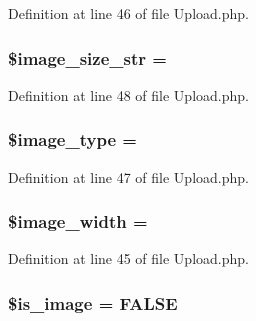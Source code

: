 Definition at line 46 of file Upload.\+php.

\subsubsection[{\texorpdfstring{\$image\+\_\+size\+\_\+str}{$image_size_str}}]{\setlength{\rightskip}{0pt plus 5cm}\$image\+\_\+size\+\_\+str = \textquotesingle{}\textquotesingle{}}\hypertarget{class_c_i___upload_a3a1769072af8ab3b0c5d6e0c1a1ae2ef}{}\label{class_c_i___upload_a3a1769072af8ab3b0c5d6e0c1a1ae2ef}


Definition at line 48 of file Upload.\+php.

\subsubsection[{\texorpdfstring{\$image\+\_\+type}{$image_type}}]{\setlength{\rightskip}{0pt plus 5cm}\$image\+\_\+type = \textquotesingle{}\textquotesingle{}}\hypertarget{class_c_i___upload_a939d6733d998cce893403d2f59f40317}{}\label{class_c_i___upload_a939d6733d998cce893403d2f59f40317}


Definition at line 47 of file Upload.\+php.

\subsubsection[{\texorpdfstring{\$image\+\_\+width}{$image_width}}]{\setlength{\rightskip}{0pt plus 5cm}\$image\+\_\+width = \textquotesingle{}\textquotesingle{}}\hypertarget{class_c_i___upload_a8dadc2d2dcc0f25529a2d1e080d08169}{}\label{class_c_i___upload_a8dadc2d2dcc0f25529a2d1e080d08169}


Definition at line 45 of file Upload.\+php.

\subsubsection[{\texorpdfstring{\$is\+\_\+image}{$is_image}}]{\setlength{\rightskip}{0pt plus 5cm}\${\bf is\+\_\+image} = F\+A\+L\+SE}\hypertarget{class_c_i___upload_a4dae8ae20ed5fdf406554e1911065753}{}\label{class_c_i___upload_a4dae8ae20ed5fdf406554e1911065753}


